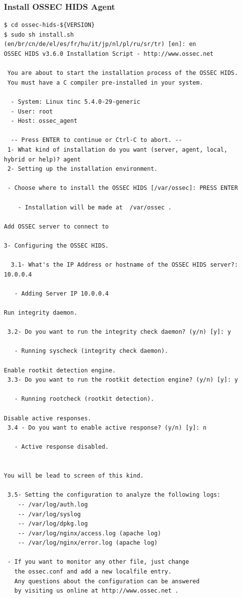 \documentclass{article}
\begin{document}
\subsubsection{Install OSSEC HIDS Agent}
\begin{verbatim}
$ cd ossec-hids-${VERSION}
$ sudo sh install.sh
(en/br/cn/de/el/es/fr/hu/it/jp/nl/pl/ru/sr/tr) [en]: en
OSSEC HIDS v3.6.0 Installation Script - http://www.ossec.net

 You are about to start the installation process of the OSSEC HIDS.
 You must have a C compiler pre-installed in your system.

  - System: Linux tinc 5.4.0-29-generic
  - User: root
  - Host: ossec_agent

  -- Press ENTER to continue or Ctrl-C to abort. --
 1- What kind of installation do you want (server, agent, local, hybrid or help)? agent
 2- Setting up the installation environment.

 - Choose where to install the OSSEC HIDS [/var/ossec]: PRESS ENTER

    - Installation will be made at  /var/ossec .

Add OSSEC server to connect to

3- Configuring the OSSEC HIDS.

  3.1- What's the IP Address or hostname of the OSSEC HIDS server?: 10.0.0.4

   - Adding Server IP 10.0.0.4

Run integrity daemon. 

 3.2- Do you want to run the integrity check daemon? (y/n) [y]: y

   - Running syscheck (integrity check daemon).

Enable rootkit detection engine. 
 3.3- Do you want to run the rootkit detection engine? (y/n) [y]: y

   - Running rootcheck (rootkit detection).

Disable active responses. 
 3.4 - Do you want to enable active response? (y/n) [y]: n

   - Active response disabled.


You will be lead to screen of this kind. 

 3.5- Setting the configuration to analyze the following logs:
    -- /var/log/auth.log
    -- /var/log/syslog
    -- /var/log/dpkg.log
    -- /var/log/nginx/access.log (apache log)
    -- /var/log/nginx/error.log (apache log)

 - If you want to monitor any other file, just change
   the ossec.conf and add a new localfile entry.
   Any questions about the configuration can be answered
   by visiting us online at http://www.ossec.net .



\end{verbatim}
\end{document}
